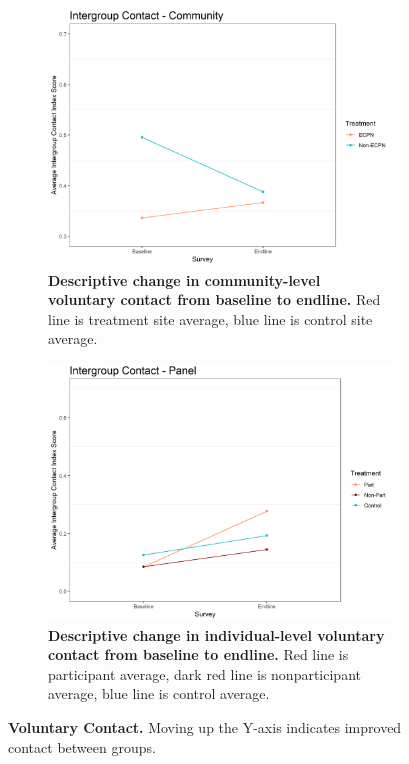 \documentclass[11pt]{article}
\begin{document}
\begin{figure}[H]
    \begin{subfigure}[b]{.48\textwidth}
    \centering
        \includegraphics[width=\linewidth]{../../../figs/conComm_plot.png}
        \caption{\textbf{Descriptive change in community-level voluntary contact from baseline to endline.} Red line is treatment site average, blue line is control site average.}
        \label{fig:fig5}
    \end{subfigure}
    \hfill
    \begin{subfigure}[b]{.48\textwidth}
    \centering
        \includegraphics[width=\linewidth]{../../../figs/conPan_plot.png}
        \caption{\textbf{Descriptive change in individual-level voluntary contact from baseline to endline.} Red line is participant average, dark red line is nonparticipant average, blue line is control average.}
        \label{fig:fig6}
    \end{subfigure}
    \caption{\textbf{Voluntary Contact.}  Moving up the Y-axis indicates improved contact between groups.}
\end{figure}
\end{document}
